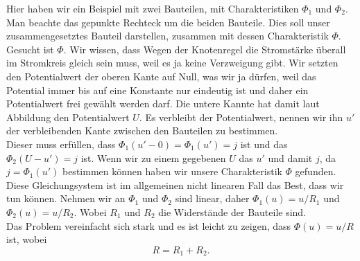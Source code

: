 \documentclass[11pt,a4paper,leqno]{report}
\numberwithin{equation}{chapter}
\begin{document}
\noindent
Hier haben wir ein Beispiel mit zwei Bauteilen, mit Charakteristiken $\Phi_1$ und $\Phi_2$. Man beachte das gepunkte Rechteck um die beiden Bauteile. Dies soll unser zusammengesetztes Bauteil darstellen, zusammen mit dessen Charakteristik $\Phi$. Gesucht ist $\Phi$. Wir wissen, dass Wegen der Knotenregel die Stromst\"arke \"uberall im Stromkreis gleich sein muss, weil es ja keine Verzweigung gibt. Wir setzten den Potentialwert der oberen Kante auf Null, was wir ja d\"urfen, weil das Potential immer bis auf eine Konstante nur eindeutig ist und daher ein Potentialwert frei gew\"ahlt werden darf. Die untere Kannte hat damit laut Abbildung den Potentialwert $U$. Es verbleibt der Potentialwert, nennen wir ihn $u'$ der verbleibenden Kante zwischen den Bauteilen zu bestimmen. \\Dieser muss erf\"ullen, dass $\Phi_1(u' - 0)=\Phi_1(u') = j$ ist und das $\Phi_2(U - u') = j$ ist. Wenn wir zu einem gegebenen $U$ das $u'$ und damit $j$, da $j = \Phi_1(u')$ bestimmen k\"onnen haben wir unsere Charakteristik $\Phi$ gefunden. Diese Gleichungsystem ist im allgemeinen nicht linearen Fall das Best, dass wir tun k\"onnen. Nehmen wir an $\Phi_1$ und $\Phi_2$ sind linear, daher $\Phi_1(u) = u / R_1$ und $\Phi_2(u) = u / R_2$. Wobei $R_1$ und $R_2$ die Widerst\"ande der Bauteile sind.\\
Das Problem vereinfacht sich stark und es ist leicht zu zeigen, dass $\Phi(u) = u / R$ ist, wobei 
\begin{equation}
	R = R_1 + R_2.
\end{equation}
\noindent
\end{document}
